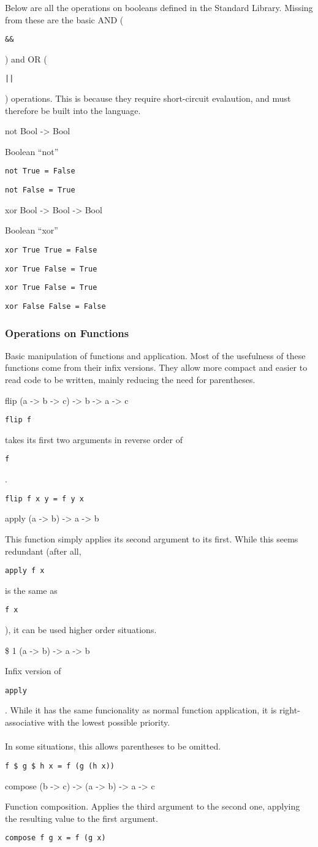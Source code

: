 \documentclass{article}
\def\code#1{\begin{footnotesize}\texttt{#1}\end{footnotesize}}
\begin{document}
Below are all the operations on booleans defined in the Standard Library.
Missing from these are the basic AND (\code{\&\&}) and OR (\code{||}) operations.
This is because they require short-circuit evalaution, and must therefore be built into the language.

\medskip

\libfunction
  {not}
  {Bool -> Bool}
  {Boolean ``not''

  \code{not True = False}

  \code{not False = True}}

\libfunction
  {xor}
  {Bool -> Bool -> Bool}
  {Boolean ``xor''

  \code{xor True  True  = False}

  \code{xor True  False = True}

  \code{xor True  False = True}

  \code{xor False False = False}}

\subsubsection{Operations on Functions}

Basic manipulation of functions and application.
Most of the usefulness of these functions come from their infix versions.
They allow more compact and easier to read code to be written, mainly reducing the need for parentheses.

\medskip

\libfunction
  {flip}
  {(a -> b -> c) -> b -> a -> c}
  {\code{flip f} takes its first two arguments in reverse order of \code{f}.

  \code{flip f x y = f y x}}

\libfunction
  {apply}
  {(a -> b) -> a -> b}
  {This function simply applies its second argument to its first.
  While this seems redundant (after all, \code{apply f x} is the same as \code{f x}), it can be used higher order situations.}

\liboperator
  {\$}
  {\rightassociative}
  {1}
  {(a -> b) -> a -> b}
  {Infix version of \code{apply}.
  While it has the same funcionality as normal function application, it is right-associative with the lowest possible priority.
  \\
  \\
  In some situations, this allows parentheses to be omitted.

  \code{f \$ g \$ h x  =  f (g (h x))}}

\libfunction
  {compose}
  {(b -> c) -> (a -> b) -> a -> c}
  {Function composition.
  Applies the third argument to the second one, applying the resulting value to the first argument.
  \\

  \code{compose f g x = f (g x)}}
\end{document}
